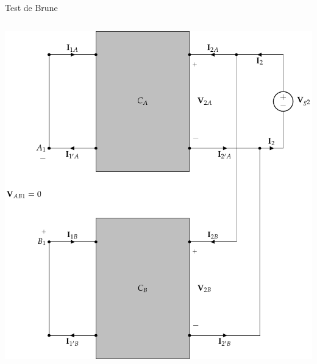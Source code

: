 \documentclass[aspectratio=169, usenames,svgnames,dvipsnames]{beamer}
\begin{document}
\begin{frame}[label={sec:org43fd4ac},plain]{Test de Brune}
\begin{columns}
\begin{column}{0.5\columnwidth}
\begin{center}
\includegraphics[height=0.8\textheight]{../figs/paralelo-paralelo-brune-salida2.pdf}
\end{center}
\end{column}
\end{columns}
\end{frame}
\end{document}
